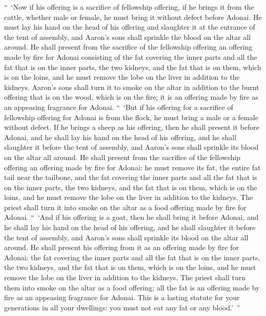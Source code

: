 \begin{biblechapter} %
 “ ‘Now if his offering is a sacrifice of fellowship offering, if he brings it from the cattle, whether male or female, he must bring it without defect before Adonai.
\verse He must lay his hand on the head of his offering and slaughter it at the entrance of the tent of assembly, and Aaron’s sons shall sprinkle the blood on the altar all around.
\verse He shall present from the sacrifice of the fellowship offering an offering made by fire for Adonai consisting of the fat covering the inner parts and all the fat that is on the inner parts,
\verse the two kidneys, and the fat that is on them, which is on the loins, and he must remove the lobe on the liver in addition to the kidneys.
\verse Aaron’s sons shall turn it to smoke on the altar in addition to the burnt offering that is on the wood, which is on the fire; it is an offering made by fire as an appeasing fragrance for Adonai.
\verse “ ‘But if his offering for a sacrifice of fellowship offering for Adonai is from the flock, he must bring a male or a female without defect.
\verse If he brings a sheep as his offering, then he shall present it before Adonai,
\verse and he shall lay his hand on the head of his offering, and he shall slaughter it before the tent of assembly, and Aaron’s sons shall sprinkle its blood on the altar all around.
\verse He shall present from the sacrifice of the fellowship offering an offering made by fire for Adonai: he must remove its fat, the entire fat tail near the tailbone, and the fat covering the inner parts and all the fat that is on the inner parts,
\verse the two kidneys, and the fat that is on them, which is on the loins, and he must remove the lobe on the liver in addition to the kidneys.
\verse The priest shall turn it into smoke on the altar as a food offering made by fire for Adonai.
\verse “ ‘And if his offering is a goat, then he shall bring it before Adonai,
\verse and he shall lay his hand on the head of his offering, and he shall slaughter it before the tent of assembly, and Aaron’s sons shall sprinkle its blood on the altar all around.
\verse He shall present his offering from it as an offering made by fire for Adonai: the fat covering the inner parts and all the fat that is on the inner parts,
\verse the two kidneys, and the fat that is on them, which is on the loins, and he must remove the lobe on the liver in addition to the kidneys.
\verse The priest shall turn them into smoke on the altar as a food offering; all the fat is an offering made by fire as an appeasing fragrance for Adonai.
\verse This is a lasting statute for your generations in all your dwellings: you must not eat any fat or any blood.’ ”
\end{biblechapter}


